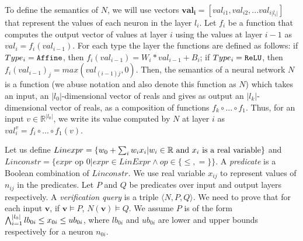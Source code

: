 

To define the semantics of $N$, we will use vectors $\boldsymbol{val_i} = [val_{i1}, val_{i2}, ... val_{i|l_i|}]$ that represent the values of each neuron in the layer $l_i$. Let $f_i$ be a function that computes the output vector of values at layer $i$ using the values at layer $i-1$ as $val_i = f_i(val_{i-1})$. For each type the layer the functions are defined as follows: if $Type_i = \texttt{Affine}$, then $f_{i}(val_{i-1}) = W_i * val_{i-1} + B_i$; if $Type_i = \texttt{ReLU}$, then $f_{i}(val_{i-1})_j =  max(val_{{(i-1)}j},0)$. Then, the semantics of a neural network $N$ is a function (we abuse notation and also denote this function as $N$) which takes an input, an $|l_0|$-dimensional vector of reals and gives as output an $|l_k|$-dimensional vector of reals, as a composition of functions $f_k \circ ... \circ f_1$. Thus, for an input $v\in \mathbb{R}^{|l_0|}$, we write its value computed by $N$ at layer $i$ as $val^v_{i}=f_i \circ ... \circ f_1(v)$.

Let us define 
$Linexpr = \{ w_0 + \sum_{i} w_i x_i | w_i \in \mathbb{R} \text{ and } x_i \text{ is a real variable} \}$
and
$Linconstr = \{expr \text{ op } 0 | expr \in LinExpr \land op \in \{\leq, = \}\}$.
A {\em predicate} is a Boolean combination of $Linconstr$.
We use real variable $x_{ij}$ to represent values of $n_{ij}$ in the predicates.
Let $P$ and $Q$ be predicates over input and output layers respectively.
A {\em verification query} is a triple $\langle N, P, Q \rangle$.
We need to prove that for each input $\boldsymbol{v}$,
if $\boldsymbol{v} \models P$, $N(\boldsymbol{v}) \models Q$.
We assume $P$ is of the form
$\bigwedge_{i=1}^{|l_0|}lb_{0i} \leq x_{0i} \leq ub_{0i}$, where $lb_{0i}$ and $ub_{0i}$ are lower and upper bounds respectively for a neuron $n_{0i}$.





